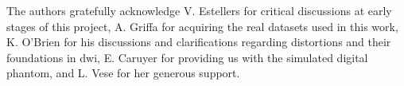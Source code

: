 The authors gratefully acknowledge V. Estellers for critical discussions 
at early stages of this project, A. Griffa for acquiring the real datasets
used in this work, K. O'Brien for his discussions and clarifications regarding
distortions and their foundations in \gls{dwi}, E. Caruyer for providing us with
the simulated digital phantom, and L. Vese for her generous support.
